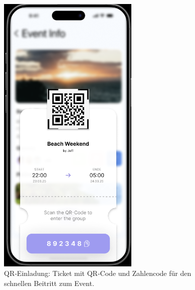 \documentclass[11pt,a4paper]{article}
\begin{document}
\begin{figure}[h]
  \centering
  \includegraphics[width=0.6\textwidth]{image-7.png}
  \caption{QR‑Einladung: Ticket mit QR‑Code und Zahlencode für den schnellen Beitritt zum Event.}
  \label{fig:share}
\end{figure}
\end{document}
